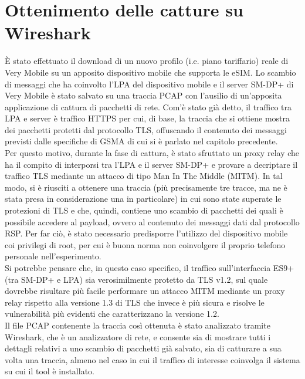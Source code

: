 \documentclass[10pt, oneside]{book}
\begin{document}
\section{Ottenimento delle catture su Wireshark}
È stato effettuato il download di un nuovo profilo (i.e. piano tariffario) reale di Very Mobile su un apposito dispositivo mobile che supporta le eSIM. Lo scambio di messaggi che ha coinvolto l'LPA del dispositivo mobile e il server SM-DP+ di Very Mobile è stato salvato su una traccia PCAP con l'ausilio di un'apposita applicazione di cattura di pacchetti di rete. Com'è stato già detto, il traffico tra LPA e server è traffico HTTPS per cui, di base, la traccia che si ottiene mostra dei pacchetti protetti dal protocollo TLS, offuscando il contenuto dei messaggi previsti dalle specifiche di GSMA di cui si è parlato nel capitolo precedente.\\
Per questo motivo, durante la fase di cattura, è stato sfruttato un proxy relay che ha il compito di interporsi tra l'LPA e il server SM-DP+ e provare a decriptare il traffico TLS mediante un attacco di tipo Man In The Middle (MITM). In tal modo, si è riusciti a ottenere una traccia (più precisamente tre tracce, ma ne è stata presa in considerazione una in particolare) in cui sono state superate le protezioni di TLS e che, quindi, contiene uno scambio di pacchetti dei quali è possibile accedere al payload, ovvero al contenuto dei messaggi dati dal protocollo RSP. Per far ciò, è stato necessario predisporre l'utilizzo del dispositivo mobile coi privilegi di root, per cui è buona norma non coinvolgere il proprio telefono personale nell'esperimento.\\
Si potrebbe pensare che, in questo caso specifico, il traffico sull'interfaccia ES9+ (tra SM-DP+ e LPA) sia verosimilmente protetto da TLS v1.2, sul quale dovrebbe risultare più facile performare un attacco MITM mediante un proxy relay rispetto alla versione 1.3 di TLS che invece è più sicura e risolve le vulnerabilità più evidenti che caratterizzano la versione 1.2.\\
Il file PCAP contenente la traccia così ottenuta è stato analizzato tramite Wireshark, che è un analizzatore di rete, e consente sia di mostrare tutti i dettagli relativi a uno scambio di pacchetti già salvato, sia di catturare a sua volta una traccia, almeno nel caso in cui il traffico di interesse coinvolga il sistema su cui il tool è installato.
\end{document}
